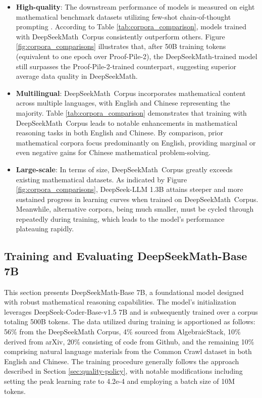 \begin{itemize}[topsep=0pt]
    \item \textbf{High-quality}:
    The downstream performance of models is measured on eight mathematical benchmark datasets utilizing few-shot chain-of-thought prompting \cite{cot}. According to Table \ref{tab:corpora_comparison}, models trained with DeepSeekMath~Corpus consistently outperform others. Figure \ref{fig:corpora_comparisons} illustrates that, after 50B training tokens (equivalent to one epoch over Proof-Pile-2), the DeepSeekMath-trained model still surpasses the Proof-Pile-2-trained counterpart, suggesting superior average data quality in DeepSeekMath.
    \item \textbf{Multilingual}:
    DeepSeekMath~Corpus incorporates mathematical content across multiple languages, with English and Chinese representing the majority. Table \ref{tab:corpora_comparison} demonstrates that training with DeepSeekMath~Corpus leads to notable enhancements in mathematical reasoning tasks in both English and Chinese. By comparison, prior mathematical corpora focus predominantly on English, providing marginal or even negative gains for Chinese mathematical problem-solving.
    \item \textbf{Large-scale}:
    In terms of size, DeepSeekMath~Corpus greatly exceeds existing mathematical datasets. As indicated by Figure \ref{fig:corpora_comparisons}, DeepSeek-LLM 1.3B attains steeper and more sustained progress in learning curves when trained on DeepSeekMath~Corpus. Meanwhile, alternative corpora, being much smaller, must be cycled through repeatedly during training, which leads to the model’s performance plateauing rapidly.
\end{itemize}

\subsection{Training and Evaluating DeepSeekMath-Base 7B}

This section presents DeepSeekMath-Base 7B, a foundational model designed with robust mathematical reasoning capabilities. The model's initialization leverages DeepSeek-Coder-Base-v1.5 7B \citep{deepseek-coder} and is subsequently trained over a corpus totaling 500B tokens. The data utilized during training is apportioned as follows: 56\% from the DeepSeekMath Corpus, 4\% sourced from AlgebraicStack, 10\% derived from arXiv, 20\% consisting of code from Github, and the remaining 10\% comprising natural language materials from the Common Crawl dataset in both English and Chinese. The training procedure generally follows the approach described in Section \ref{sec:quality-policy}, with notable modifications including setting the peak learning rate to 4.2e-4 and employing a batch size of 10M tokens.

